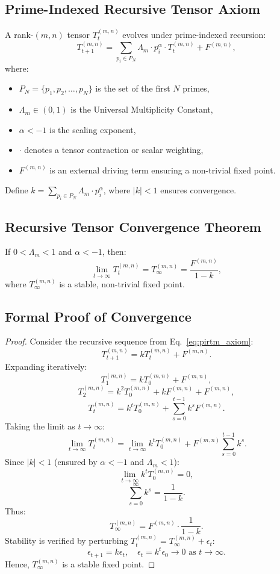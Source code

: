 \documentclass{article}
\theoremstyle{plain}
\begin{document}
\subsection{Prime-Indexed Recursive Tensor Axiom}
A rank-$(m,n)$ tensor \( T_t^{(m,n)} \) evolves under prime-indexed recursion:
\begin{equation}
T_{t+1}^{(m,n)} = \sum_{p_i \in P_N} \Lambda_m \cdot p_i^\alpha \cdot T_t^{(m,n)} + F^{(m,n)},
\label{eq:pirtm_axiom}
\end{equation}
where:
\begin{itemize}
    \item \( P_N = \{p_1, p_2, \dots, p_N\} \) is the set of the first \( N \) primes,
    \item \( \Lambda_m \in (0, 1) \) is the Universal Multiplicity Constant,
    \item \( \alpha < -1 \) is the scaling exponent,
    \item \( \cdot \) denotes a tensor contraction or scalar weighting,
    \item \( F^{(m,n)} \) is an external driving term ensuring a non-trivial fixed point.
\end{itemize}
Define \( k = \sum_{p_i \in P_N} \Lambda_m \cdot p_i^\alpha \), where \( |k| < 1 \) ensures convergence.

\subsection{Recursive Tensor Convergence Theorem}
If \( 0 < \Lambda_m < 1 \) and \( \alpha < -1 \), then:
\begin{equation}
\lim_{t \to \infty} T_t^{(m,n)} = T_\infty^{(m,n)} = \frac{F^{(m,n)}}{1 - k},
\label{eq:pirtm_theorem}
\end{equation}
where \( T_\infty^{(m,n)} \) is a stable, non-trivial fixed point.

\subsection{Formal Proof of Convergence}
\begin{proof}
Consider the recursive sequence from Eq.~\eqref{eq:pirtm_axiom}:
\[
T_{t+1}^{(m,n)} = k T_t^{(m,n)} + F^{(m,n)}.
\]
Expanding iteratively:
\[
T_1^{(m,n)} = k T_0^{(m,n)} + F^{(m,n)},
\]
\[
T_2^{(m,n)} = k^2 T_0^{(m,n)} + k F^{(m,n)} + F^{(m,n)},
\]
\[
T_t^{(m,n)} = k^t T_0^{(m,n)} + \sum_{s=0}^{t-1} k^s F^{(m,n)}.
\]
Taking the limit as \( t \to \infty \):
\[
\lim_{t \to \infty} T_t^{(m,n)} = \lim_{t \to \infty} k^t T_0^{(m,n)} + F^{(m,n)} \sum_{s=0}^{t-1} k^s.
\]
Since \( |k| < 1 \) (ensured by \( \alpha < -1 \) and \( \Lambda_m < 1 \)):
\[
\lim_{t \to \infty} k^t T_0^{(m,n)} = 0,
\]
\[
\sum_{s=0}^\infty k^s = \frac{1}{1 - k}.
\]
Thus:
\[
T_\infty^{(m,n)} = F^{(m,n)} \cdot \frac{1}{1 - k}.
\]
Stability is verified by perturbing \( T_t^{(m,n)} = T_\infty^{(m,n)} + \epsilon_t \):
\[
\epsilon_{t+1} = k \epsilon_t, \quad \epsilon_t = k^t \epsilon_0 \to 0 \text{ as } t \to \infty.
\]
Hence, \( T_\infty^{(m,n)} \) is a stable fixed point.
\end{proof}
\end{document}
